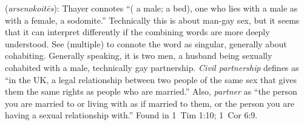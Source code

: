 \item[Gay-partner,]

(\textit{arsenokoitēs}):
Thayer connotes ``( a male;  a bed), one who lies with a male as with a female, a sodomite.'' Technically this is about man-gay sex, but it seems that it can interpret differently if the combining words are more deeply understood. See  (multiple) to connote the word  as singular, generally about cohabiting. Generally speaking, it is two men, a husband being sexually cohabited with a male, technically gay partnership. \emph{Civil partnership} defines as ``in the UK, a legal relationship between two people of the same sex that gives them the same rights as people who are married.'' Also, \emph{partner} as ``the person you are married to or living with as if married to them, or the person you are having a sexual relationship with.''
Found in 1~Tim 1:10; 1~Cor 6:9.
